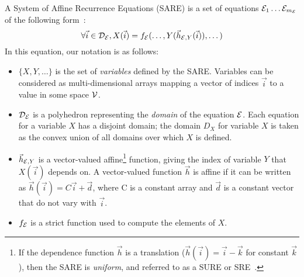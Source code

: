 A System of Affine Recurrence Equations (SARE) is a set of equations
${\cal E}_1 \dots {\cal E}_{m_{\cal E}}$ of the following form~\cite{DRV00}:
\begin{equation}
\forall {\vec i} \in {\cal D_{\cal E}}, X({\vec i}) = f_{\cal E}(\dots, Y({\vec h}_{{\cal
E}, Y}({\vec i})), \dots)
\label{eq:sare}
\end{equation}
In this equation, our notation is as follows:
\begin{itemize}

\item $\{X, Y, \dots\}$ is the set of {\it variables} defined by the
SARE.  Variables can be considered as multi-dimensional arrays mapping
a vector of indices ${\vec i}$ to a value in some space ${\cal V}$.

\item ${\cal D_{\cal E}}$ is a polyhedron representing the {\it
domain} of the equation ${\cal E}$.  Each equation for a variable $X$
has a disjoint domain; the domain $D_X$ for variable $X$ is taken as
the convex union of all domains over which $X$ is defined.

\item ${\vec h}_{{\cal E}, Y}$ is a vector-valued affine\footnote{If
the dependence function ${\vec h}$ is a translation (${\vec h}({\vec
i}) = {\vec i} - {\vec k}$ for constant ${\vec k}$), then the SARE is
{\it uniform}, and referred to as a SURE or SRE~\cite{karp67}.}
function, giving the index of variable $Y$ that $X({\vec i})$ depends
on.  A vector-valued function ${\vec h}$ is affine if it can be
written as ${\vec h}({\vec i}) = C{\vec i} + {\vec d}$, where C is a
constant array and ${\vec d}$ is a constant vector that do not vary
with ${\vec i}$.

\item $f_{\cal E}$ is a strict function used to compute the elements
of $X$.

\end{itemize}
